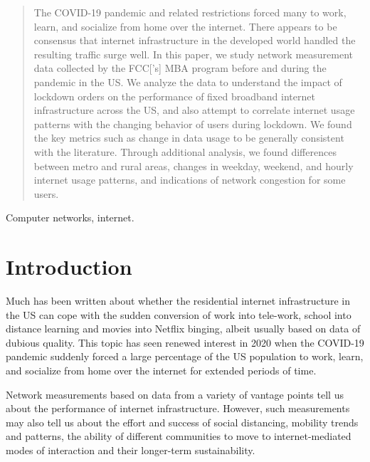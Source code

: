 \documentclass[conference,10pt]{IEEEtran}
\begin{document}
\begin{abstract}
The COVID-19 pandemic and related restrictions forced many to work, learn, and socialize from home over the internet. There appears to be consensus that internet infrastructure in the developed world handled the resulting traffic surge well. In this paper, we study network measurement data collected by the \glsdesc{FCC}['s] \glsdesc{MBA} program before and during the pandemic in the \gls{US}. We analyze the data to understand the impact of lockdown orders on the performance of fixed broadband internet infrastructure across the US, and also attempt to correlate internet usage patterns with the changing behavior of users during lockdown. We found the key metrics such as change in data usage to be generally consistent with the literature. Through additional analysis, we found differences between metro and rural areas, changes in weekday, weekend, and hourly internet usage patterns, and indications of network congestion for some users.


\end{abstract}

\begin{IEEEkeywords}
Computer networks, internet.
\end{IEEEkeywords}

\glsresetall

\section{Introduction}\label{sec:introduction}

Much has been written about whether the residential internet infrastructure in the \gls{US} can cope with the sudden conversion of work into tele-work, school into distance learning and movies into Netflix binging, albeit usually based on data of dubious quality. This topic has seen renewed interest in 2020 when the COVID-19 pandemic suddenly forced a large percentage of the \gls{US} population to work, learn, and socialize from home over the internet for extended periods of time.

Network measurements based on data from a variety of vantage points tell us about the performance of internet infrastructure. However, such measurements may also tell us about the effort and success of social distancing, mobility trends and patterns, the ability of different communities to move to internet-mediated modes of interaction and their longer-term sustainability.
\end{document}
